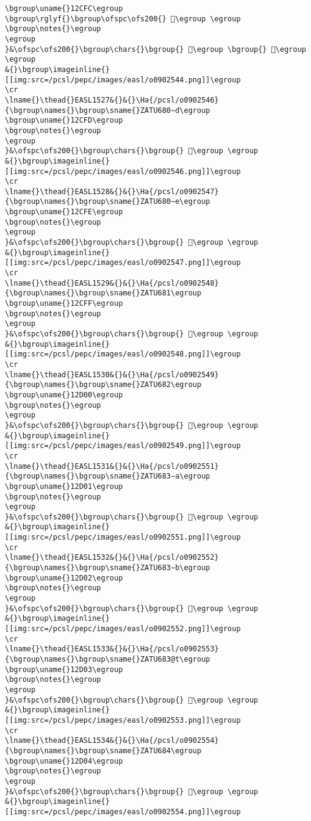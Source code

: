 \begin{verbatim}
\bgroup\uname{}12CFC\egroup
\bgroup\rglyf{}\bgroup\ofspc\ofs200{} 𒳼\egroup \egroup
\bgroup\notes{}\egroup
\egroup
}&\ofspc\ofs200{}\bgroup\chars{}\bgroup{} 𒳻\egroup \bgroup{} 𒳼\egroup \egroup
&{}\bgroup\imageinline{}[[img:src=/pcsl/pepc/images/easl/o0902544.png]]\egroup
\cr
\lname{}\thead{}EASL1527&{}&{}\Ha{/pcsl/o0902546}{\bgroup\names{}\bgroup\sname{}ZATU680∼d\egroup
\bgroup\uname{}12CFD\egroup
\bgroup\notes{}\egroup
\egroup
}&\ofspc\ofs200{}\bgroup\chars{}\bgroup{} 𒳽\egroup \egroup
&{}\bgroup\imageinline{}[[img:src=/pcsl/pepc/images/easl/o0902546.png]]\egroup
\cr
\lname{}\thead{}EASL1528&{}&{}\Ha{/pcsl/o0902547}{\bgroup\names{}\bgroup\sname{}ZATU680∼e\egroup
\bgroup\uname{}12CFE\egroup
\bgroup\notes{}\egroup
\egroup
}&\ofspc\ofs200{}\bgroup\chars{}\bgroup{} 𒳾\egroup \egroup
&{}\bgroup\imageinline{}[[img:src=/pcsl/pepc/images/easl/o0902547.png]]\egroup
\cr
\lname{}\thead{}EASL1529&{}&{}\Ha{/pcsl/o0902548}{\bgroup\names{}\bgroup\sname{}ZATU681\egroup
\bgroup\uname{}12CFF\egroup
\bgroup\notes{}\egroup
\egroup
}&\ofspc\ofs200{}\bgroup\chars{}\bgroup{} 𒳿\egroup \egroup
&{}\bgroup\imageinline{}[[img:src=/pcsl/pepc/images/easl/o0902548.png]]\egroup
\cr
\lname{}\thead{}EASL1530&{}&{}\Ha{/pcsl/o0902549}{\bgroup\names{}\bgroup\sname{}ZATU682\egroup
\bgroup\uname{}12D00\egroup
\bgroup\notes{}\egroup
\egroup
}&\ofspc\ofs200{}\bgroup\chars{}\bgroup{} 𒴀\egroup \egroup
&{}\bgroup\imageinline{}[[img:src=/pcsl/pepc/images/easl/o0902549.png]]\egroup
\cr
\lname{}\thead{}EASL1531&{}&{}\Ha{/pcsl/o0902551}{\bgroup\names{}\bgroup\sname{}ZATU683∼a\egroup
\bgroup\uname{}12D01\egroup
\bgroup\notes{}\egroup
\egroup
}&\ofspc\ofs200{}\bgroup\chars{}\bgroup{} 𒴁\egroup \egroup
&{}\bgroup\imageinline{}[[img:src=/pcsl/pepc/images/easl/o0902551.png]]\egroup
\cr
\lname{}\thead{}EASL1532&{}&{}\Ha{/pcsl/o0902552}{\bgroup\names{}\bgroup\sname{}ZATU683∼b\egroup
\bgroup\uname{}12D02\egroup
\bgroup\notes{}\egroup
\egroup
}&\ofspc\ofs200{}\bgroup\chars{}\bgroup{} 𒴂\egroup \egroup
&{}\bgroup\imageinline{}[[img:src=/pcsl/pepc/images/easl/o0902552.png]]\egroup
\cr
\lname{}\thead{}EASL1533&{}&{}\Ha{/pcsl/o0902553}{\bgroup\names{}\bgroup\sname{}ZATU683@t\egroup
\bgroup\uname{}12D03\egroup
\bgroup\notes{}\egroup
\egroup
}&\ofspc\ofs200{}\bgroup\chars{}\bgroup{} 𒴃\egroup \egroup
&{}\bgroup\imageinline{}[[img:src=/pcsl/pepc/images/easl/o0902553.png]]\egroup
\cr
\lname{}\thead{}EASL1534&{}&{}\Ha{/pcsl/o0902554}{\bgroup\names{}\bgroup\sname{}ZATU684\egroup
\bgroup\uname{}12D04\egroup
\bgroup\notes{}\egroup
\egroup
}&\ofspc\ofs200{}\bgroup\chars{}\bgroup{} 𒴄\egroup \egroup
&{}\bgroup\imageinline{}[[img:src=/pcsl/pepc/images/easl/o0902554.png]]\egroup

\end{verbatim}
